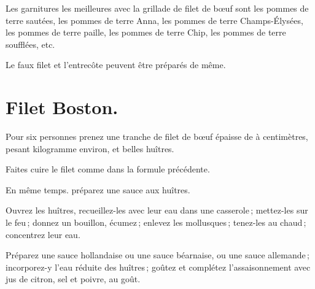 Les garnitures les meilleures avec la grillade de filet de bœuf sont les pommes
de terre sautées, les pommes de terre Anna, les pommes de terre Champs-Élysées,
les pommes de terre paille, les pommes de terre Chip, les pommes de terre
soufflées, etc.

\sk

Le faux filet et l'entrecôte peuvent être préparés de même.

\section*{\centering Filet Boston.}
{}

Pour six personnes prenez une tranche de filet de bœuf épaisse de {\mmm}
à {\mmm} centimètres, pesant {\mmm} kilogramme environ, et
{\mmm} belles huîtres.

Faites cuire le filet comme dans la formule précédente.

En même temps. préparez une sauce aux huîtres.

Ouvrez les huîtres, recueillez-les avec leur eau dans une casserole ;
mettez-les sur le feu ; donnez un bouillon, écumez ; enlevez les mollusques ;
tenez-les au chaud ; concentrez leur eau.

Préparez une sauce hollandaise ou une sauce béarnaise, ou une sauce allemande ;
incorporez-y l’eau réduite des huîtres ; goûtez et complétez l'assaisonnement
avec jus de citron, sel et poivre, au goût.


